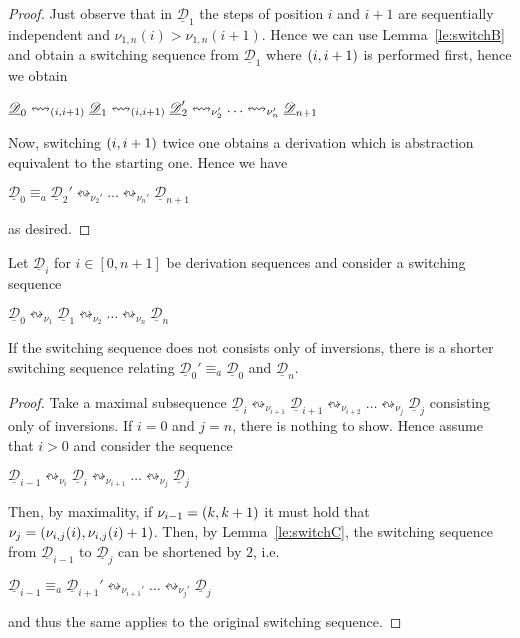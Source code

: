 \documentclass[a4paper,UKenglish,cleveref,pdftex,thm-restate,numberwithinsect]{lipics-v2021}
\newcommand{\interval}[2][1]{\ensuremath{[{#1},{#2}]}}
\newcommand{\dder}[1]{\mathscr{#1}}
\newcommand{\der}[1]{\underline{\dder{#1}}}
\newcommand{\shift}[1]{\ensuremath{\mathrel{{\leftrightsquigarrow}_{#1}}}}
\begin{document}
\begin{proof}
  Just observe that in $\der{D}_1$ the steps of position $i$ and $i+1$
  are sequentially independent and $\nu_{1,n}(i) >
  \nu_{1,n}(i+1)$. Hence we can use Lemma~\ref{le:switchB} and obtain
  a switching sequence from $\der{D}_1$ where $\transp{i}$ is
  performed first, hence we obtain
  \begin{center}
    $\der{D}_0 \shift{\transp{i}}
    \der{D}_1 \shift{\transp{i}}
    \der{D}_2' \shift{\nu_2'} \ldots
    \shift{\nu_n'} \der{D}_{n+1}$
  \end{center}

  Now, switching $\transp{i}$ twice one obtains a derivation
  which is abstraction equivalent to the starting one.  Hence we have
  \begin{center}
    $\der{D}_0 \equiv_a
    \der{D}_2' \shift{\nu_2'} \ldots
    \shift{\nu_n'} \der{D}_{n+1}$
  \end{center}
  as desired.
\end{proof}


\begin{lemma}
  \label{le:switchD}
  Let $\der{D}_i$ for $i \in \interval[0]{n+1}$ be derivation sequences
  and consider a switching sequence
  \begin{center}
    $\der{D}_0 \shift{\nu_1} \der{D}_1 \shift{\nu_2} \ldots
    \shift{\nu_n}\der{D}_n$
  \end{center}
  If the switching sequence does not consists only of inversions,
  there is a shorter switching sequence relating
  $\der{D}_0' \equiv_a \der{D}_0$ and $\der{D}_n$.
\end{lemma}

\begin{proof}
  Take a maximal subsequence
  $\der{D}_i \shift{\nu_{i+1}} \der{D}_{i+1} \shift{\nu_{i+2}} \ldots
  \shift{\nu_j}\der{D}_j$ consisting only of inversions.
  If $i=0$ and $j=n$, there is nothing to show. Hence assume that
  $i>0$ and consider the sequence
  \begin{center}
    $\der{D}_{i-1} \shift{\nu_{i}} \der{D}_{i} \shift{\nu_{i+1}} \ldots
    \shift{\nu_j}\der{D}_j$
  \end{center}
  Then, by maximality, if $\nu_{i-1}=\transp{k}$ it must hold that
  $\nu_{j}=\transp{\nu_{i,j}(i)}$. Then, by Lemma~\ref{le:switchC},
  the switching sequence from $\der{D}_{i-1}$ to $\der{D}_{j}$ can be
  shortened by $2$, i.e.
  \begin{center}
    $\der{D}_{i-1} \equiv_a \der{D}_{i+1}' \shift{\nu_{i+1}'} \ldots
    \shift{\nu_j'}\der{D}_j$
  \end{center}
  and thus the same applies to the original switching sequence.
\end{proof}
\end{document}
